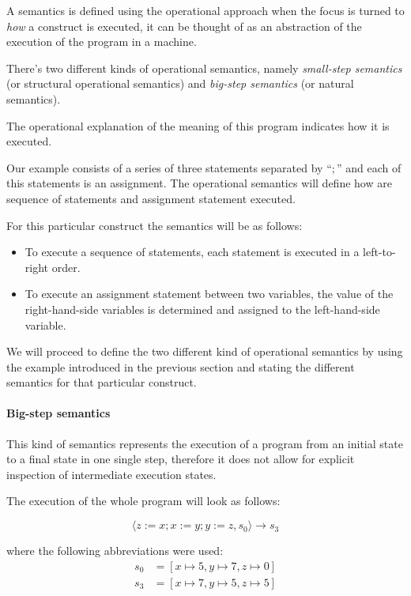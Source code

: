A semantics is defined using the operational approach when the focus is turned to \textit{how} a construct is executed, it can be thought of as an abstraction of the execution of the program in a machine.~\parencite{nielson}

There's two different kinds of operational semantics, namely \textit{small-step semantics} (or structural operational semantics) and \textit{big-step semantics} (or natural semantics).

The operational explanation of the meaning of this program indicates how it is executed.

Our example consists of a series of three statements separated by ``$;$'' and each of this statements is an assignment.
The operational semantics will define how are sequence of statements and assignment statement executed.

For this particular construct the semantics will be as follows:

\begin{itemize}
\item{To execute a sequence of statements, each statement is executed in a left-to-right order.}
\item{To execute an assignment statement between two variables, the value of the right-hand-side variables is determined and assigned to the left-hand-side variable.}
\end{itemize}


We will proceed to define the two different kind of operational semantics by using the example introduced in the previous section and stating the different semantics for that particular construct.

\paragraph{Big-step semantics}

This kind of semantics represents the execution of a program from an initial state to a final state in one single step, therefore it does not allow for explicit inspection of intermediate execution states.~\parencite{nipkow}

The execution of the whole program will look as follows:

\begin{equation*}
\langle z:=x; x:=y; y:=z, s_{0} \rangle \rightarrow s_{3}
\end{equation*}

where the following abbreviations were used:
\begin{align*}
s_{0} &= [x\mapsto5, y\mapsto7, z\mapsto0]\\
s_{3} &= [x\mapsto7, y\mapsto5, z\mapsto5]
\end{align*}

